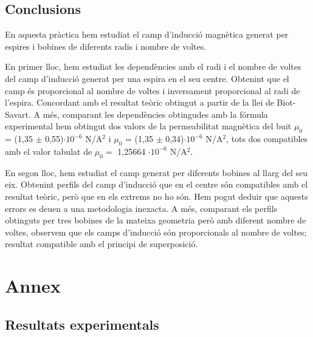 \documentclass[11pt]{article}
\numberwithin{equation}{section}
\numberwithin{figure}{section}
\numberwithin{table}{section}
\begin{document}
\subsection{Conclusions}\label{sec: conclusions}
En aquesta pràctica hem estudiat el camp d'inducció magnètica generat per espires i bobines de diferents radis i nombre de voltes. 

En primer lloc, hem estudiat les dependències amb el radi i el nombre de voltes del camp d'inducció generat per una espira en el seu centre. Obtenint que el camp és proporcional al nombre de voltes i inversament proporcional al radi de l'espira. Concordant amb el resultat teòric obtingut a partir de la llei de Biot-Savart. A més, comparant les dependències obtingudes amb la fórmula experimental hem obtingut dos valors de la permeabilitat magnètica del buit $\mu_0$ = (1,35 $\pm$ 0,55)$\cdot10^{-6}$ N/A$^2$ i $\mu_0$ = (1,35 $\pm$ 0,34)$\cdot10^{-6}$ N/A$^2$, tots dos compatibles amb el valor tabulat de $\mu_0 =$  1,25664 $\cdot 10^{-6}$ N/A$^2$.

En segon lloc, hem estudiat el camp generat per diferents bobines al llarg del seu eix. Obtenint perfils del camp d'inducció que en el centre són compatibles amb el resultat teòric, però que en els extrems no ho són. Hem pogut deduir que aquests errors es deuen a una metodologia inexacta. A més, comparant els perfils obtinguts per tres bobines de la mateixa geometria però amb diferent nombre de voltes, observem que els camps d'inducció són proporcionals al nombre de voltes; resultat compatible amb el principi de superposició.


\newpage

\appendix
\section{Annex}


\subsection{Resultats experimentals}\label{taules_dades_exp}
\end{document}
